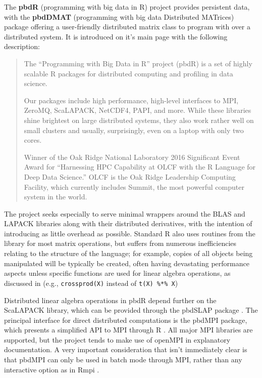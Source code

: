 \documentclass[a4paper,10pt]{article}
\begin{document}
The \textbf{pbdR} (programming with big data in R) project provides persistent data, with the \textbf{pbdDMAT} (programming with big data Distributed MATrices) package offering a user-friendly distributed matrix class to program with over a distributed system.
It is introduced on it's main page with the
following description:
\begin{quote}
        The ``Programming with Big Data in R'' project (pbdR) is a set of highly scalable
        R packages for distributed computing and profiling in data science.

        Our packages include high performance, high-level interfaces to MPI, ZeroMQ,
        ScaLAPACK, NetCDF4, PAPI, and more. While these libraries shine brightest on
        large distributed systems, they also work rather well on small clusters and
        usually, surprisingly, even on a laptop with only two cores.

        Winner of the Oak Ridge National Laboratory 2016 Significant Event Award for
        ``Harnessing HPC Capability at OLCF with the R Language for Deep Data Science.''
        OLCF is the Oak Ridge Leadership Computing Facility, which currently includes
        Summit, the most powerful computer system in the world.\cite{pbdR2012}
\end{quote}
The project seeks especially to serve minimal wrappers around the BLAS and LAPACK
libraries along with their distributed derivatives, with the intention of
introducing as little overhead as possible.  Standard R also uses routines from
the library for most matrix operations, but suffers from numerous
inefficiencies relating to the structure of the language; for example, copies
of all objects being manipulated will be typically be created, often having
devastating performance aspects unless specific functions are used for linear
algebra operations, as discussed in \citeauthor{schmidt2017programming} (e.g.,
\texttt{crossprod(X)} instead of \texttt{t(X) \%*\% X})

Distributed linear algebra operations in pbdR depend further on the ScaLAPACK
library, which can be provided through the pbdSLAP package \cite{Chen2012pbdSLAPpackage}.
The principal interface for direct distributed computations is the pbdMPI
package, which presents a simplified API to MPI through R
\cite{Chen2012pbdMPIpackage}.  All major MPI libraries are supported, but the
project tends to make use of openMPI in explanatory documentation. A very
important consideration that isn't immediately clear  is that pbdMPI can only
be used in batch mode through MPI, rather than any interactive option as in
Rmpi \cite{yu02:_rmpi}.
\end{document}
